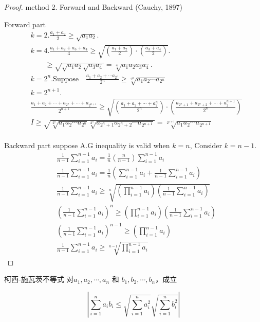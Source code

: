 \begin{proof}
method 2. Forward and Backward (Cauchy, 1897)

Forward part
\begin{align*}
	&k = 2. \frac{a_1+a_2}{2}\ge \sqrt{a_1a_2}.\\
	&k = 4. \frac{a_1+a_2+a_3+a_4}{4} \ge\sqrt{(\frac{a_1+a_2}{2})\cdot(\frac{a_3+a_4}{2})}.\\
	&\qquad  \ge \sqrt{\sqrt{a_1a_2}\sqrt{a_3a_4}} = \sqrt[4]{a_1a_2a_3a_4}.\\
	&k = 2^n. \text{Suppose}\quad \frac{a_1+a_2+\cdots a_{2^n}}{2^n} \ge \sqrt[2^n]{a_1a_2\cdots a_{2^n}}\\
	&k = 2^{n+1}.\\
	&	\frac{a_1+a_2+\cdots+a_{2^n}+\cdots+a_{2^{n+1}}}{2^{n+1}} \ge \sqrt{(\frac{a_1+a_2+\cdots+a_2^{n}}{2^n})\cdot(\frac{a_{2^{n} + 1}+a_{2^{n}+2}+\cdots+a_2^{n+1}}{2^n})}\\
	&I\ge \sqrt{\sqrt[2^n]{a_1a_2\cdots a_{2^n}}\sqrt[2^n]{a_{2^n+1} a_{2^n+2}\cdots a_{2^{n+1}}}} = \sqrt[2^{n+1}]{a_1a_2\cdots a_{2^{n+1}}}\\
\end{align*}

Backward part
suppose A.G inequality is valid when $ k = n $, Consider $ k = n-1 $.
\begin{align*}
	&\frac{1}{n-1}\sum_{i=1}^{n-1} a_i = \frac{1}{n}(\frac{n}{n-1})\sum_{i=1}^{n-1}a_i\\
	&\frac{1}{n-1}\sum_{i=1}^{n-1} a_i = \frac{1}{n}(\sum_{i=1}^{n-1} a_i + \frac{1}{n-1} \sum_{i=1}^{n-1} a_i)\\
	&\frac{1}{n-1} \sum_{i=1}^{n-1} a_i \ge \sqrt[n]{(\prod_{i=1}^{n-1} a_i)(\frac{1}{n-1}\sum_{i=1}^{n-1} a_i)}\\
	&(\frac{1}{n-1} \sum_{i=1}^{n-1} a_i)^n \ge (\prod_{i=1}^{n-1} a_i)(\frac{1}{n-1}\sum_{i=1}^{n-1} a_i)\\
	&(\frac{1}{n-1} \sum_{i=1}^{n-1} a_i)^{n-1} \ge (\prod_{i=1}^{n-1} a_i)\\
	&\frac{1}{n-1} \sum_{i=1}^{n-1} a_i \ge \sqrt[n-1]{\prod_{i=1}^{n-1} a_i}
\end{align*}
\end{proof}

\begin{proposition}[1.3.5]
	 柯西-施瓦茨不等式
	对$ a_1,a_2,\cdots,a_n $ 和 $ b_1,b_2,\cdots,b_n $，成立
\end{proposition}


\begin{equation*}
	|\sum_{i=1}^n a_i b_i \le \sqrt{\sum_{i=1}^n a_i^2}\sqrt{\sum_{i=1}^n b_i^2}|
\end{equation*}

